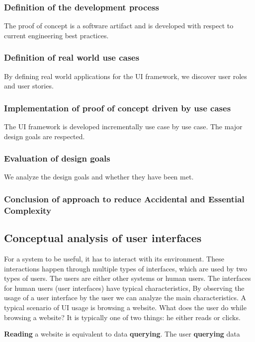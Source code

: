 \subsubsection{Definition of the development process}
The proof of concept is a software artifact and is developed with respect to current engineering best practices.

\subsubsection{Definition of real world use cases}
By defining real world applications for the UI framework, we discover user roles and user stories.

\subsubsection{Implementation of proof of concept driven by use cases}
The UI framework is developed incrementally use case by use case. The major design goals are respected.

\subsubsection{Evaluation of design goals}
We analyze the design goals and whether they have been met.

\subsubsection{Conclusion of approach to reduce Accidental and Essential Complexity}

\subsection{Conceptual analysis of user interfaces}
For a system to be useful, it has to interact with its environment. These interactions happen through multiple types of interfaces, which are used by two types of users. The users are either other systems or human users.
The interfaces for human users (user interfaces) have typical characteristics,
By observing the usage of a user interface by the user we can analyze the main characteristics. A typical scenario of UI usage is browsing a website. What does the user do while browsing a website? It is typically one of two things: he either reads or clicks.

\textbf{Reading} a website is equivalent to data \textbf{querying}. The user \textbf{querying} data

